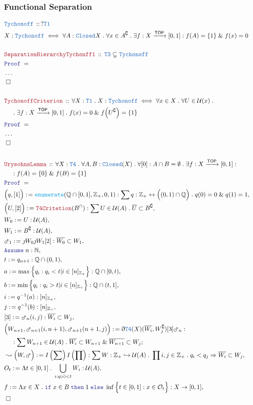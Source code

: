 \documentclass[12pt]{scrartcl}
\newcommand{\TYPE}[1]{\textcolor{NavyBlue}{\mathtt{#1}}}
\newcommand{\FUNC}[1]{\textcolor{Cerulean}{\mathtt{#1}}}
\newcommand{\LOGIC}[1]{\textcolor{Blue}{\mathtt{#1}}}
\newcommand{\THM}[1]{\textcolor{Maroon}{\mathtt{#1}}}
\renewcommand{\.}{\; . \;}
\newcommand{\de}{: \kern 0.1pc =}
\newcommand{\If}{\LOGIC{if} \;}
\newcommand{\Then}{ \; \LOGIC{then} \;}
\newcommand{\Else}{\; \LOGIC{else} \;}
\newcommand{\Act}[1]{\left( #1 \right)}
\newcommand{\Theorem}[2]{& \THM{#1} \, :: \, #2 \\ & \Proof = \\ }
\newcommand{\DeclareType}[2]{& \TYPE{#1} \, :: \, #2 \\}
\newcommand{\DefineType}[3]{& #1 : \TYPE{#2} \iff #3 \\}
\newcommand{\NewLine}{\\ & \kern 1pc}
\newcommand{\Page}[1]{ \begin{align*} #1 \end{align*}   }
\newcommand{ \bd }{ \ByDef }
\newcommand{\NoProof}{ & \ldots \\ \EndProof}
\renewcommand{\And}{\; \& \;}
\newcommand{\Imply}{\Rightarrow}
\newcommand{\Int}{\mathbb{Z} }
\newcommand{\Rats}{\mathbb{Q} }
\newcommand{\Nat}{\mathbb{N} }
\newcommand{\ToInj}{\hookrightarrow}
\newcommand{\ToBij}{\leftrightarrow}
\newcommand{\Arrow}{\xrightarrow}
\renewcommand{\c}{\complement}
\newcommand{\Say}[3]{& #1 \de #2 : #3, \\}
\newcommand{\Conclude}[3]{& #1 \de #2 : #3; \\}
\newcommand{\Derive}[3]{& \leadsto #1 \de #2 : #3, \\}
\newcommand{\Assume}[2]{& \LOGIC{Assume} \; #1 : #2, \\}
\newcommand{\QED}{\; \square}
\newcommand{\EndProof}{& \QED \\}
\newcommand{\ByDef}{\eth}
\newcommand{\ByConstr}{\jmath}
\newcommand{\Proof}{\LOGIC{Proof} \; }
\newcommand{\TOP}{\mathsf{TOP}}
\newcommand{\U}{\mathcal{U}}
\renewcommand{\O}{\mathcal{O}}
\begin{document}
\subsubsection{Functional Separation}
\Page{
	\DeclareType{Tychonoff}{?\TYPE{T1}}   
	\DefineType{X}{Tychonoff}{ 
		\forall A : \TYPE{Closed}{X} \.   
		\forall x \in A^\c \.
		\exists f : X \Arrow{\TOP} [0,1] :
		f(A) = \{1\} \And f(x) = 0
	}
	\\
	\Theorem{SeparationHierarchyTychonff1}
	{
		\TYPE{T3} \subsetneq \TYPE{Tychonoff}
	}
	\NoProof
	\\
	\Theorem{TychonoffCriterion}
	{
		\forall X : \TYPE{T1} \.
		X : \TYPE{Tychonoff} 
		\iff
		\forall x \in X \.
		\forall U \in \U(x) \. \NewLine \.  
		\exists f : X \Arrow{\TOP} [0,1] \.
		f(x) = 0 \And f\Big(U^\c\Big) = \{1\}
	}
	\NoProof
	\\
	\Theorem{UrysohnsLemma}
	{
		\forall X : \TYPE{T4} \.
		\forall A,B : \TYPE{Closed}(X) \. 
		\forall [0] : A \cap B = \emptyset \.
		\exists f : X \Arrow{\TOP} [0,1] : \NewLine : 
		f(A) = \{0\} \And f(B) = \{1\}
	}
	\Say{\Big(q,[1]\Big)}{\FUNC{enumerate}(\Rats \cap [0,1], \Int_+, 0,1)}
	{
		\sum  q : \Int_+ \ToBij \Big( (0, 1) \cap \Rats \Big) \. q(0) = 0 \And q(1) = 1 
	}
	\Say{\Big( U,  [2] \Big)}{ \THM{T4Critetion}(B^\cap) }
	{
		\sum U \in \U(A) \. 
		\overline{U} \subset B^\c
	}
	\Say{W_0}{U}{\U(A)}
	\Say{W_1}{B^\c}{\U(A)}
	\Say{\mars_1}{\ByConstr W_0 \ByConstr W_1[2]}{ \overline{W_0} \subset W_1}
	\Assume{n}{\Nat}
	\Say{t}{q_{n+1}}{\Rats \cap (0,1)}
	\Say{a}{ \max \Big\{ q_i :  q_i < t | i \in [n]_{\Int_+}  \Big\} }{\Rats \cap [0,t)} 
	\Say{b}{ \min \Big\{ q_i :  q_i > t | i \in [n]_{\Int_+}  \Big\} }{\Rats \cap (t,1]}
	\Say{i}{q^{-1}(a)}{[n]_{\Int_+}} 
	\Say{j}{q^{-1}(b)}{[n]_{\Int_+}}
	\Say{[3]}{\mars_n(i,j)}{\overline{W_i} \subset W_j}
	\Conclude{ \Big(W_{n+1}, \mars_{n+1}(i,n+1),\mars_{n+1}(n+1,j)  \Big) }
	{ \bd \TYPE{T4}(X)(\overline{W_i}, W_j^\c) [3] \mars_n   }
	{    
		\NewLine : 
		\sum W_{n+1} \in \U(A) \.   \overline{ W_i} \subset W_{n+1} \And \overline{W_{n+1}} \subset W_j
	}  
	\Derive{\Big( W, \mars \Big) }{I\Act{\sum}I\Act{\prod}}
	{
		\sum  W : \Int_+ \ToInj \U(A) \. \prod  i,j \in \Int_+ \. q_i < q_j \Imply \overline{W_i} \subset W_j
	}
	\Say{O_t}{\Lambda t \in [0,1] \. \bigcup_{i : q(i) < t} W_i}{\U(A)}
	\Say{f}{\Lambda x \in X \. \If x \in B \Then 1 \Else \inf 
		\Big\{  t \in [0,1] :  x \in \O_t   \Big\}}{X \to [0,1]}            
	\EndProof
}
\end{document}
